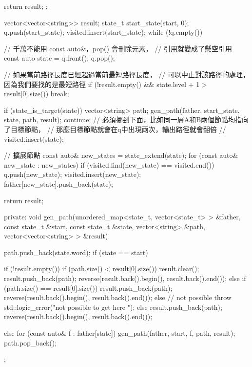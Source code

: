 \begin{Code}
{{{            return result;
        };

        vector<vector<string>> result;
        state_t start_state(start, 0);
        q.push(start_state);
        visited.insert(start_state);
        while (!q.empty()) {
            // 千萬不能用 const auto&，pop() 會刪除元素，
            // 引用就變成了懸空引用
            const auto state = q.front();
            q.pop();

            // 如果當前路徑長度已經超過當前最短路徑長度，
            // 可以中止對該路徑的處理，因為我們要找的是最短路徑
            if (!result.empty() && state.level + 1 > result[0].size()) break;

            if (state_is_target(state)) {
                vector<string> path;
                gen_path(father, start_state, state, path, result);
                continue;
            }
            // 必須挪到下面，比如同一層A和B兩個節點均指向了目標節點，
            // 那麼目標節點就會在q中出現兩次，輸出路徑就會翻倍
            // visited.insert(state);

            // 擴展節點
            const auto& new_states = state_extend(state);
            for (const auto& new_state : new_states) {
                if (visited.find(new_state) == visited.end()) {
                    q.push(new_state);
                }
                visited.insert(new_state);
                father[new_state].push_back(state);
            }
        }

        return result;
    }
private:
    void gen_path(unordered_map<state_t, vector<state_t> > &father,
        const state_t &start, const state_t &state, vector<string> &path,
        vector<vector<string> > &result) {
        path.push_back(state.word);
        if (state == start) {
            if (!result.empty()) {
                if (path.size() < result[0].size()) {
                    result.clear();
                    result.push_back(path);
                    reverse(result.back().begin(), result.back().end());
                } else if (path.size() == result[0].size()) {
                    result.push_back(path);
                    reverse(result.back().begin(), result.back().end());
                } else { // not possible
                    throw std::logic_error("not possible to get here ");
                }
            } else {
                result.push_back(path);
                reverse(result.back().begin(), result.back().end());
            }

        } else {
            for (const auto& f : father[state]) {
                gen_path(father, start, f, path, result);
            }
        }
        path.pop_back();
    }
};
\end{Code}


